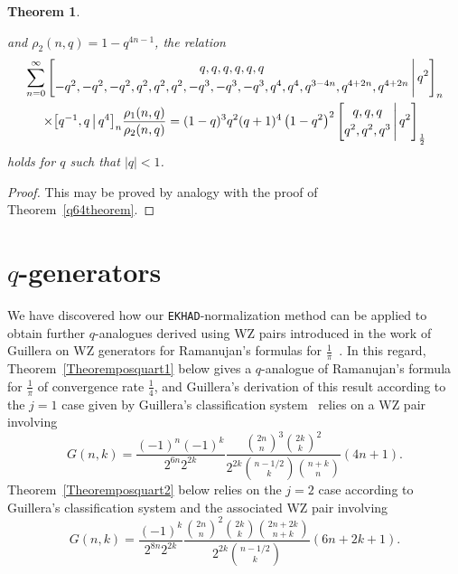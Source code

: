 \documentclass[12pt]{article}
\newtheorem{theorem}{Theorem}
\begin{document}
\begin{theorem}
 \ 

\noindent and $\rho_{2}(n, q) = 1-q^{4 n-1}$, the relation 
\begin{multline*}
 \sum_{n=0}^{\infty} 
 \left[ \begin{matrix} q, q, q, q, q, q \vspace{1mm} \\ 
 -q^2, -q^2, -q^2, q^2, q^2, q^2, -q^3, -q^3, -q^3, q^4, q^4, q^{3-4n}, q^{4+2n}, q^{4+2n}
 \end{matrix} \, \Bigg| \, q^2 \right]_{n} \\ 
 \times \big[ \begin{matrix} q^{-1}, q 
 \end{matrix} \, \big| \, q^4 \big]_{n} \frac{\rho_1(n, q)}{ \rho_2(n ,q) } = 
 (1-q)^3 q^2 (q+1)^4 \left(1-q^2\right)^2 
 \left[ \begin{matrix} q, q, q \vspace{1mm} \\ 
 q^2, q^2, q^3 \end{matrix} \, \Bigg| \, q^2 \right]_{\frac{1}{2}} 
\end{multline*}
 holds for $q$ such that $|q| < 1$. 
\end{theorem}

\begin{proof}
 This may be proved by analogy with the proof of Theorem~\ref{q64theorem}. 
\end{proof}

\section{$q$-generators}\label{sectionqgenerators}
 We have discovered how our {\tt EKHAD}-normalization method can    be applied to obtain further $q$-analogues derived     using WZ   
  pairs introduced  in the work of     Guillera on WZ generators for Ramanujan's formulas   for $\frac{1}{\pi}$~\cite{Guillera2006}.   
  In this regard, 
    Theorem~\ref{Theoremposquart1} below gives a 
 $q$-analogue of Ramanujan's formula for $\frac{1}{\pi}$ of convergence rate $\frac{1}{4}$, 
 and Guillera's derivation of this result according to the $j = 1$ case given by Guillera's classification system~\cite{Guillera2006}
 relies on a WZ pair involving
 $$ G(n, k) = 
 \frac{ (-1)^{n} (-1)^{k} }{2^{6n} 2^{2k}} 
 \frac{ \binom{2n}{n}^{3} \binom{2k}{k}^{2} }{2^{2k} \binom{n-1/2}{k} \binom{n+k}{n} } (4n+1). $$
 Theorem~\ref{Theoremposquart2} below 
 relies on the $j = 2$ case according to Guillera's classification system and the associated WZ pair involving
 $$ G(n, k) = \frac{(-1)^{k} }{2^{8n} 2^{2k}} \frac{ \binom{2n}{n}^{2} 
 \binom{2k}{k} \binom{2n+2k}{n+k} }{2^{2k} \binom{n-1/2}{k}} (6n+2k+1). $$
\end{document}
